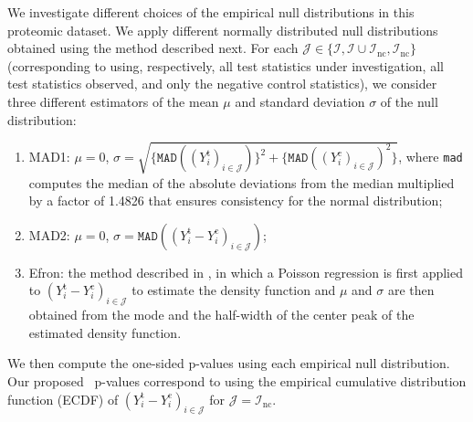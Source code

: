 \documentclass[a4paper,11pt]{article}
\theoremstyle{plain}
\theoremstyle{definition}
\def\calI{\mathcal{I}}
\def\calJ{\mathcal{J}}
\theoremstyle{plain}
\newcommand{\nickname}{{\text{RANC}}}
\newcommand{\responseTreatment}[1]{{Y_{#1}^{\text{t}}}}
\newcommand{\responseControl}[1]{{Y_{#1}^{\text{c}}}}
\newcommand{\BH}{{\text{BH}}}
\begin{document}
We investigate different choices of the empirical null distributions
in this proteomic dataset. We apply different normally distributed
null distributions obtained using the method described next. For each
$\calJ \in \{\calI, \calI \cup
\calI_{\text{nc}}, \calI_{\text{nc}}\}$ (corresponding to using,
respectively, all
test statistics under investigation, all test statistics observed, and
only the negative control statistics), we consider three different
estimators of the mean $\mu$ and standard deviation $\sigma$ of the null
distribution:
\begin{enumerate}
\item MAD1: $\mu = 0$, $\sigma =
  \sqrt{\{\texttt{MAD}((\responseTreatment{i})_{i \in \calJ})\}^2 +
    \{\texttt{MAD}((\responseControl{i})_{i \in \calJ})^2\}}$, where
  \texttt{mad} computes the median of the absolute deviations from the
  median multiplied by a factor of 1.4826 that ensures consistency for the
  normal distribution;
\item MAD2: $\mu = 0$, $\sigma =
  \texttt{MAD}((\responseTreatment{i} - \responseControl{i})_{i \in
    \calJ})$;
\item Efron: the method described in \textcite{efron2004large}, in
  which a Poisson regression is first applied to
  $(\responseTreatment{i} - \responseControl{i})_{i \in \calJ}$ to
  estimate the density function and $\mu$ and $\sigma$ are
  then obtained from the mode and the half-width of the center peak of
  the estimated density function.
\end{enumerate}
We then compute the one-sided p-values using each empirical null
distribution. Our proposed \nickname~p-values correspond to using the
empirical cumulative distribution function (ECDF) of
$(\responseTreatment{i} - \responseControl{i})_{i \in
    \calJ}$ for $\calJ = \calI_{\text{nc}}$.
\end{document}
